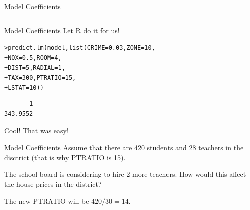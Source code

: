 \documentclass{beamer}\usepackage[]{graphicx}\usepackage[]{color}
\makeatletter
\newcommand{\hlnum}[1]{\textcolor[rgb]{0.824,0.412,0.118}{#1}}%
\newcommand{\hlstd}[1]{\textcolor[rgb]{1,0.894,0.769}{#1}}%
\newcommand{\hlkwc}[1]{\textcolor[rgb]{0.78,0.941,0.545}{#1}}%
\newcommand{\hlkwd}[1]{\textcolor[rgb]{1,0.78,0.769}{#1}}%
\newenvironment{kframe}{%
 \def\at@end@of@kframe{}%
 \ifinner\ifhmode%
  \def\at@end@of@kframe{\end{minipage}}%
  \begin{minipage}{\columnwidth}%
 \fi\fi%
 \def\FrameCommand##1{\hskip\@totalleftmargin \hskip-\fboxsep
 \colorbox{shadecolor}{##1}\hskip-\fboxsep
     \hskip-\linewidth \hskip-\@totalleftmargin \hskip\columnwidth}%
 \MakeFramed {\advance\hsize-\width
   \@totalleftmargin\z@ \linewidth\hsize
   \@setminipage}}%
 {\par\unskip\endMakeFramed%
 \at@end@of@kframe}
\newenvironment{knitrout}{}{} %
\makeatother
\begin{document}
\begin{darkframes}
\begin{frame}[fragile]{Model Coefficients}
\begin{table}[!b]
{\begin{tabularx}{\textwidth}{XXrrr}
        
        \end{tabularx}}
        
      \end{table} 
      
    \end{frame}



    \begin{frame}[fragile]{Model Coefficients}
      Let R do it for us!
      
\begin{knitrout}
\begin{kframe}
\begin{alltt}
\hlstd{> }\hlkwd{predict.lm}\hlstd{(model,} \hlkwd{list}\hlstd{(}\hlkwc{CRIME}\hlstd{=}\hlnum{0.03}\hlstd{,} \hlkwc{ZONE}\hlstd{=}\hlnum{10}\hlstd{,}
\hlstd{+ }                       \hlkwc{NOX}\hlstd{=}\hlnum{0.5}\hlstd{,} \hlkwc{ROOM}\hlstd{=}\hlnum{4}\hlstd{,}
\hlstd{+ }                       \hlkwc{DIST}\hlstd{=}\hlnum{5}\hlstd{,}  \hlkwc{RADIAL}\hlstd{=}\hlnum{1}\hlstd{,}
\hlstd{+ }                       \hlkwc{TAX}\hlstd{=}\hlnum{300}\hlstd{,} \hlkwc{PTRATIO}\hlstd{=}\hlnum{15}\hlstd{,}
\hlstd{+ }                       \hlkwc{LSTAT}\hlstd{=}\hlnum{10}\hlstd{))}
\end{alltt}
\begin{verbatim}
       1 
343.9552 
\end{verbatim}
\end{kframe}
\end{knitrout}
      \pause
      Cool! That was easy!
      
    \end{frame}
    
    
    \begin{frame}[fragile]{Model Coefficients}
      Assume that there are 420 students and 28 teachers in the disctrict (that is why PTRATIO is 15). \pause
      
      \bigskip
      
      The school board is considering to hire 2 more teachers. How would this affect the house prices in the district? \pause
      
      \bigskip
      
      The new PTRATIO will be $420/30=14$. \pause
      

\end{frame}
\end{darkframes}
\end{document}
